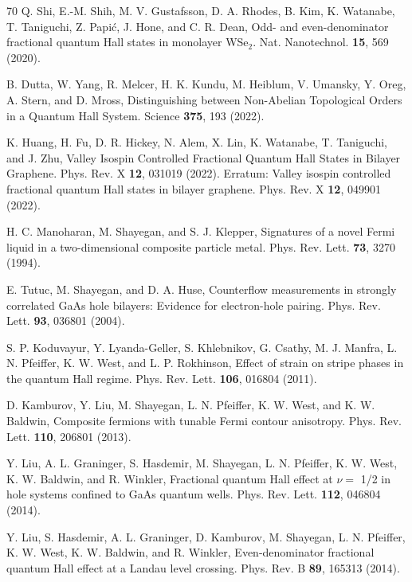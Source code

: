 \documentclass[reprint,amsmath,amssymb,aps,prl,nobibnotes,superscriptaddress]{revtex4-1}
\begin{document}
\begin{thebibliography}{70}
 Q. Shi, E.-M. Shih, M. V. Gustafsson, D. A. Rhodes, B. Kim, K. Watanabe, T. Taniguchi, Z. Papić, J. Hone, and C. R. Dean, Odd- and even-denominator fractional quantum Hall states in monolayer WSe$_2$. Nat. Nanotechnol. \textbf{15}, 569 (2020).

  B. Dutta, W. Yang, R. Melcer, H. K. Kundu, M. Heiblum, V.
Umansky, Y. Oreg, A. Stern, and D. Mross, Distinguishing
between Non-Abelian Topological Orders in a Quantum
Hall System. Science \textbf{375}, 193 (2022).

 K. Huang, H. Fu, D. R. Hickey, N. Alem, X. Lin, K.
Watanabe, T. Taniguchi, and J. Zhu, Valley Isospin Controlled Fractional Quantum Hall States in Bilayer Graphene.
Phys. Rev. X \textbf{12}, 031019 (2022). Erratum: Valley isospin controlled fractional quantum Hall states in bilayer graphene. Phys. Rev. X \textbf{12}, 049901 (2022).

 H. C. Manoharan, M. Shayegan, and S. J. Klepper, Signatures of a novel Fermi liquid in a two-dimensional composite particle metal. Phys. Rev. Lett. \textbf{73}, 3270 (1994).

E. Tutuc, M. Shayegan, and D. A. Huse, Counterflow
measurements in strongly correlated GaAs hole bilayers:
Evidence for electron-hole pairing. Phys. Rev. Lett. \textbf{93}, 036801 (2004).

 S. P. Koduvayur, Y. Lyanda-Geller, S. Khlebnikov, G.
Csathy, M. J. Manfra, L. N. Pfeiffer, K. W. West, and
L. P. Rokhinson, Effect of strain on stripe phases in the quantum Hall regime. Phys. Rev. Lett. \textbf{106}, 016804
(2011).

D. Kamburov, Y. Liu, M. Shayegan, L. N. Pfeiffer, K.
W. West, and K. W. Baldwin, Composite fermions with
tunable Fermi contour anisotropy. Phys. Rev. Lett. \textbf{110}, 206801 (2013).

 Y. Liu, A. L. Graninger, S. Hasdemir, M. Shayegan, L.
N. Pfeiffer, K. W. West, K. W. Baldwin, and R. Winkler, Fractional quantum Hall effect at $\nu=$ 1/2 in hole systems confined to GaAs quantum wells. Phys. Rev. Lett. \textbf{112}, 046804 (2014).

 Y. Liu, S. Hasdemir, A. L. Graninger, D. Kamburov, M.
Shayegan, L. N. Pfeiffer, K. W. West, K. W. Baldwin,
and R. Winkler, Even-denominator fractional quantum
Hall effect at a Landau level crossing. Phys. Rev. B \textbf{89},
165313 (2014).


\end{thebibliography}
\end{document}
